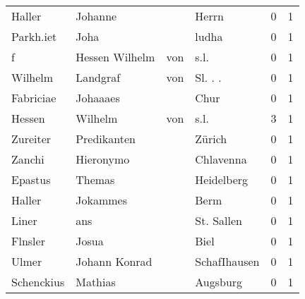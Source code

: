 \begin{center}
\begin{tiny}
\begin{longtabu}{llllrr}
                   Haller &                            Johanne &             &                                       Herrn &          0 &         1 \\
                Parkh.iet &                               Joha &             &                                       ludha &          0 &         1 \\
                        f &                     Hessen Wilhelm &         von &                                        s.l. &          0 &         1 \\
                  Wilhelm &                           Landgraf &         von &                                    Sl. . .  &          0 &         1 \\
                Fabriciae &                           Johaaaes &             &                                        Chur &          0 &         1 \\
                   Hessen &                            Wilhelm &         von &                                        s.l. &          3 &         1 \\
                 Zureiter &                        Predikanten &             &                                      Zürich &          0 &         1 \\
                   Zanchi &                          Hieronymo &             &                                   Chlavenna &          0 &         1 \\
                  Epastus &                             Themas &             &                                  Heidelberg &          0 &         1 \\
                   Haller &                           Jokammes &             &                                        Berm &          0 &         1 \\
                    Liner &                                ans &             &                                  St. Sallen &          0 &         1 \\
                  Flnsler &                              Josua &             &                                        Biel &          0 &         1 \\
                    Ulmer &                      Johann Konrad &             &                                SchafIhausen &          0 &         1 \\
               Schenckius &                            Mathias &             &                                    Augsburg &          0 &         1 \\

\end{longtabu}
\end{tiny}
\end{center}
